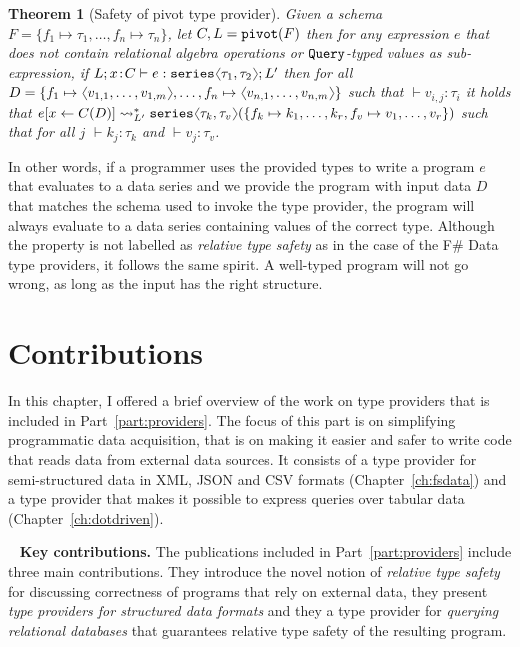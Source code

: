 \documentclass[fleqn,11pt]{report}
\newcommand{\ident}[1]{\textnormal{\ttfamily #1}}
\newcommand{\langl}{\begin{picture}(4.5,7)
\put(1.1,2.5){\rotatebox{60}{\line(1,0){5.5}}}
\put(1.1,2.5){\rotatebox{300}{\line(1,0){5.5}}}
\end{picture}}
\newcommand{\rangl}{\begin{picture}(4.5,7)
\put(.9,2.5){\rotatebox{120}{\line(1,0){5.5}}}
\put(.9,2.5){\rotatebox{240}{\line(1,0){5.5}}}
\end{picture}}
\newcommand{\vect}[1]{\langl #1 \rangl}
\newtheorem{theorem}{Theorem}
\theoremstyle{definition}
\DeclareRobustCommand{\keyideabox}[3]{\begin{tcolorbox}[breakable,
  boxsep=10pt,left=0pt,right=0pt,top=0pt,bottom=0pt,width=\dimexpr\textwidth\relax,
  colback=gray!20,colframe=gray!20,
  enlarge bottom by=5pt,enlarge top by=5pt,
  arc=0pt,outer arc=0pt]
\lettrine[lraise=0.3]{\LARGE #1}{~}
\textbf{#2.} #3
\end{tcolorbox}
}
\begin{document}
\begin{theorem}[Safety of pivot type provider]
\label{thm:pivot-safe}
Given a schema $F=\{f_1\mapsto\tau_1, \ldots, f_n\mapsto\tau_n \}$, let $C,L=\ident{pivot}(F)$ then for any
expression $e$ that does not contain relational algebra operations or $\ident{Query}$-typed values as sub-expression,
if $L;x\!:\!C \vdash e : \ident{series}\langl\tau_1,\tau_2\rangl; L'$ then for all $D =
\{ f_1\mapsto\vect{v_{1,1},\ldots,v_{1,m}}, \ldots, f_n\mapsto\vect{v_{n,1},\ldots,v_{n,m}} \}$
such that $\vdash v_{i, j} : \tau_i$ it holds that $e[x\leftarrow C(D)]\leadsto_{L'}^{*}
  \ident{series}\langl\tau_k,\tau_v\rangl(\{ f_k\mapsto{k_1,\ldots,k_r}, f_v\mapsto{v_1,\ldots,v_r} \})$
  such that for all $j$ $\vdash k_j : \tau_k$ and $\vdash v_j : \tau_v$.
\end{theorem}

In other words, if a programmer uses the provided types to write a program $e$ that evaluates to
a data series and we provide the program with input data $D$ that matches the schema used to invoke
the type provider, the program will always evaluate to a data series containing values of the
correct type. Although the property is not labelled as \emph{relative type safety} as in the
case of the F\# Data type providers, it follows the same spirit. A well-typed program will not
go wrong, as long as the input has the right structure.

\section{Contributions}
In this chapter, I offered a brief overview of the work on type providers that is included in
Part~\ref{part:providers}. The focus of this part is on simplifying programmatic
data acquisition, that is on making it easier and safer to write code that reads data from external
data sources. It consists of a type provider for semi-structured data in XML, JSON and
CSV formats (Chapter~\ref{ch:fsdata}) and a type provider that makes it possible to
express queries over tabular data (Chapter~\ref{ch:dotdriven}).

\keyideabox{\faPencilSquareO}{Key contributions}{The publications included in Part~\ref{part:providers}
include three main contributions. They introduce the novel notion of \emph{relative type safety}
for discussing correctness of programs that rely on external data, they present \emph{type providers
for structured data formats} and they a type provider for \emph{querying relational databases}
that guarantees relative type safety of the resulting program.}
\end{document}
